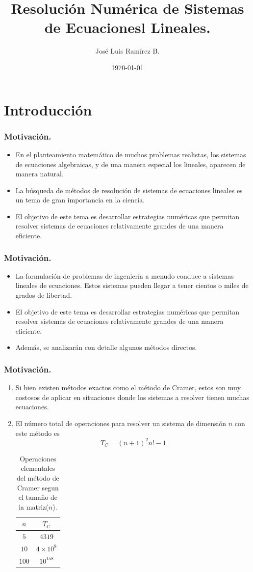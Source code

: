 \documentclass{beamer}
\title{Resoluci\'on Num\'erica de Sistemas de Ecuacionesl Lineales.}
\author{Jos\'e Luis Ram\'irez B.}
\date{\today}
\begin{document}
\frame{\titlepage}

\frame{\tableofcontents}

\section{Introducci\'on}
\begin{frame}[fragile]
  \frametitle{Motivaci\'on.} 
  \begin{itemize}
    \item En el planteamiento matem\'atico de muchos problemas realistas, los sistemas de ecuaciones algebraicas, y de una manera especial los lineales, aparecen de manera natural.
    \item<2-> La b\'usqueda de m\'etodos de resoluci\'on de sistemas de ecuaciones lineales es un tema de gran importancia en la ciencia.
    \item<3-> El objetivo de este tema es desarrollar estrategias num\'ericas que permitan resolver sistemas de ecuaciones relativamente grandes de una manera eficiente.
  \end{itemize}    
\end{frame}
\frame
{
  \frametitle{Motivaci\'on.} 
  \begin{itemize}
   \item<1->La formulaci\'on de problemas de ingenier\'ia a menudo conduce a sistemas lineales de ecuaciones. Estos sistemas pueden llegar a tener cientos o miles de grados de libertad. 
   \item<2-> El objetivo de este tema es desarrollar estrategias num\'ericas que permitan resolver sistemas de ecuaciones relativamente grandes de una manera eficiente. 
   \item<3-> Adem\'as, se analizar\'an con detalle algunos m\'etodos directos.
  \end{itemize}
}
\frame
{
   \frametitle{Motivaci\'on.}
   \begin{enumerate}
    \item Si bien existen m\'etodos exactos  como el m\'etodo de Cramer, estos son muy costosos de aplicar en situaciones donde los sistemas a resolver tienen muchas ecuaciones.
    \item<2-> El n\'umero total de operaciones para resolver un sistema de dimensi\'on $n$ con este m\'etodo es
    $$
    T_C = (n+1)^{2}n!-1
    $$

    \begin{table}[!ht]
    \begin{tabular}{|c|c|}\hline
    $n$ & $T_C$  \\\hline
    $5$ & $4319$ \\\hline
    $10$ & $4\times10^8$\\\hline
    $100$ &  $10^{158}$\\\hline
    \end{tabular}
    \caption{Operaciones elementales del m\'etodo de Cramer segun el tama\~no de la matriz($n$).}
    \end{table}
  \end{enumerate}
}
\end{document}
